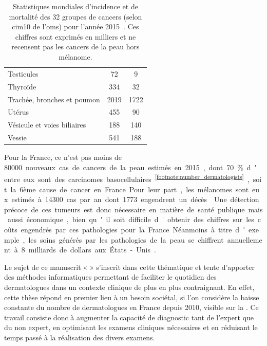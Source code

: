 \begin{table}[H]
\begin{tabular}{lSS}
        Testicules                              & 72                            & 9                         \\
        Thyroïde                                & 334                           & 32                        \\
        Trachée, bronches et poumon             & 2019                          & 1722                      \\
        Utérus                                  & 455                           & 90                        \\
        Vésicule et voies biliaires             & 188                           & 140                       \\
        Vessie                                  & 541                           & 188                       \\ \bottomrule
    \end{tabular}
    \caption{Statistiques mondiales d’incidence et de mortalité des 32 groupes de cancers (selon \gls{cim10} de l'\gls{oms}) pour l'année 2015~\cite{Fitzmaurice2017}. Ces chiffres sont exprimés en milliers et ne recensent pas les cancers de la peau hors mélanome.}
    \label{tab:introduction_cancer_incidence}
\end{table}

Pour la France, ce n’est pas moins de \SI{80000} nouveaux cas de cancers de la peau estimés en 2015, dont 70~\% d'entre eux sont des carcinomes basocellulaires~\textsuperscript{\ref{footnote:number_dermatologists}}, soit la 6ème cause de cancer en France. Pour leur part, les mélanomes sont eux estimés à \SI{14300} cas par an dont \SI{1773} engendrent un décès~\cite{Thuret2012}. Une détection précoce de ces tumeurs est donc nécessaire en matière de santé publique mais aussi économique, bien qu'il soit difficile d'obtenir des chiffres sur les coûts engendrés par ces pathologies pour la France. Néanmoins à titre d'exemple, les soins générés par les pathologies de la peau se chiffrent annuellement à 8 milliards de dollars aux États-Unis~\cite{Farberg2017a}.\par

\addtocounter{footnote}{1}

Le sujet de ce manuscrit « \titleref » s’inscrit dans cette thématique et tente d’apporter des méthodes informatiques permettant de faciliter le quotidien des dermatologues dans un contexte clinique de plus en plus contraignant. En effet, cette thèse répond en premier lieu à un besoin sociétal, si l'on considère la baisse constante du nombre de dermatologues en France depuis 2010, visible sur la . Ce travail consiste donc à augmenter la capacité de diagnostic tant de l'expert que du non expert, en optimisant les examens cliniques nécessaires et en réduisant le temps passé à la réalisation des divers examens.\par

